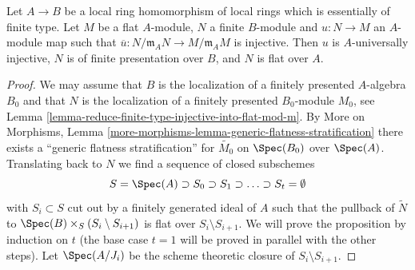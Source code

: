 \begin{proposition}
\label{proposition-finite-type-injective-into-flat-mod-m}
Let $A \to B$ be a local ring homomorphism of local rings
which is essentially of finite type. Let $M$ be a flat $A$-module,
$N$ a finite $B$-module and $u : N \to M$ an $A$-module map such that
$\overline{u} : N/\mathfrak m_AN \to M/\mathfrak m_AM$ is injective.
Then $u$ is $A$-universally injective, $N$ is of finite presentation over
$B$, and $N$ is flat over $A$.
\end{proposition}

\begin{proof}
We may assume that $B$ is the localization of a finitely presented
$A$-algebra $B_0$ and that $N$ is the localization of a
finitely presented $B_0$-module $M_0$, see
Lemma \ref{lemma-reduce-finite-type-injective-into-flat-mod-m}.
By More on Morphisms, Lemma
\ref{more-morphisms-lemma-generic-flatness-stratification}
there exists a ``generic flatness stratification''
for $\widetilde{M_0}$ on $\Spec(B_0)$ over $\Spec(A)$.
Translating back to $N$ we find a sequence of closed subschemes
$$
S = \Spec(A) \supset S_0 \supset S_1 \supset \ldots \supset S_t = \emptyset
$$
with $S_i \subset S$ cut out by a finitely generated ideal of $A$
such that the pullback of $\widetilde{N}$ to
$\Spec(B) \times_S (S_i \setminus S_{i + 1})$ is flat over
$S_i \setminus S_{i + 1}$. We will prove the proposition by
induction on $t$ (the base case $t = 1$ will be proved in parallel
with the other steps). Let $\Spec(A/J_i)$ be the scheme theoretic
closure of $S_i \setminus S_{i + 1}$.


\end{proof}
